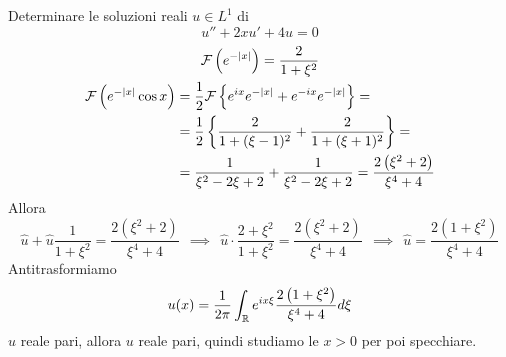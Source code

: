 Determinare le soluzioni reali $u\in L^{1}$ di
\begin{equation*}
u''+2xu'+4u=0
\end{equation*}
\ParteSoluzioni
\Soluzione
\begin{gather*}
\mathcal{F} \left( e^{-| x| }\right) =\frac{2}{1+\xi ^{2}}\\
\begin{aligned}
\mathcal{F} \left( e^{-| x| }\cos x\right) & =\frac{1}{2}\mathcal{F} \left\{e^{ix} e^{-| x| } +e^{-ix} e^{-| x| }\right\} =\\
 & =\frac{1}{2}\left\{\frac{2}{1+( \xi -1)^{2}} +\frac{2}{1+( \xi +1)^{2}}\right\} =\\
 & =\frac{1}{\xi ^{2} -2\xi +2} +\frac{1}{\xi ^{2} -2\xi +2} =\frac{2\left( \xi ^{2} +2\right)}{\xi ^{4} +4}
\end{aligned}
\end{gather*}
Allora
\begin{equation*}
\hat{u} +\hat{u}\frac{1}{1+\xi ^{2}} =\frac{2\left( \xi ^{2} +2\right)}{\xi ^{4} +4} \ \ \implies \ \ \hat{u} \cdotp \frac{2+\xi ^{2}}{1+\xi ^{2}} =\frac{2\left( \xi ^{2} +2\right)}{\xi ^{4} +4} \ \ \implies \ \ \hat{u} =\frac{2\left( 1+\xi ^{2}\right)}{\xi ^{4} +4}
\end{equation*}
Antitrasformiamo
\begin{equation*}
u( x) =\frac{1}{2\pi }\int _{\mathbb{R} } e^{ix\xi }\frac{2\left( 1+\xi ^{2}\right)}{\xi ^{4} +4} d\xi 
\end{equation*}
$\hat{u}$ reale pari, allora $u$ reale pari, quindi studiamo le $x >0$ per poi specchiare.

